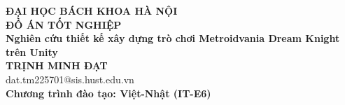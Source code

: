\documentclass[DoAn.tex]{subfiles}
\begin{document}
\begin{titlepage}
\thispagestyle{empty}

\begin{center}

{\textbf{\large{ĐẠI HỌC BÁCH KHOA HÀ NỘI}}}\\[4cm]

{\textbf{\huge{ĐỒ ÁN TỐT NGHIỆP}}}\\[1cm]
{\textbf{\Large{Nghiên cứu thiết kế xây dựng trò chơi Metroidvania Dream Knight trên Unity}}}\\[1cm]

{\textbf{\large{TRỊNH MINH ĐẠT}}}\\
{\large{dat.tm225701@sis.hust.edu.vn}}\\[0.5cm]

{\textbf{\large{Chương trình đào tạo: Việt-Nhật (IT-E6)}}}\\

\vspace{2cm}

\begin{table}[H]
\centering
{}
\end{table}
\end{center}

\end{titlepage}
\end{document}
